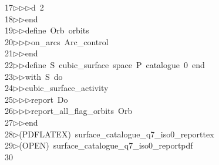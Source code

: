 \begin{tabbing}
17\>$\triangleright$\>$\triangleright$\>$\triangleright$\>d\ 2\ \\[0pt]
18\>$\triangleright$\>$\triangleright$\>end\ \\[0pt]
19\>$\triangleright$\>$\triangleright$\>define\ Orb\ orbits\ \\[0pt]
20\>$\triangleright$\>$\triangleright$\>$\triangleright$\>on\_arcs\ Arc\_control\ \\[0pt]
21\>$\triangleright$\>$\triangleright$\>end\ \\[0pt]
22\>$\triangleright$\>$\triangleright$\>define\ S\ cubic\_surface\ space\ P\ catalogue\ 0\ end\ \\[0pt]
23\>$\triangleright$\>$\triangleright$\>with\ S\ do\ \\[0pt]
24\>$\triangleright$\>$\triangleright$\>cubic\_surface\_activity\ \\[0pt]
25\>$\triangleright$\>$\triangleright$\>$\triangleright$\>report\ Do\ \\[0pt]
26\>$\triangleright$\>$\triangleright$\>$\triangleright$\>report\_all\_flag\_orbits\ Orb\ \\[0pt]
27\>$\triangleright$\>$\triangleright$\>end\\[0pt]
28\>$\triangleright$\>(PDFLATEX)\ surface\_catalogue\_q7\_iso0\_reporttex\\[0pt]
29\>$\triangleright$\>(OPEN)\ surface\_catalogue\_q7\_iso0\_reportpdf\\[0pt]
30\>\end{tabbing}

